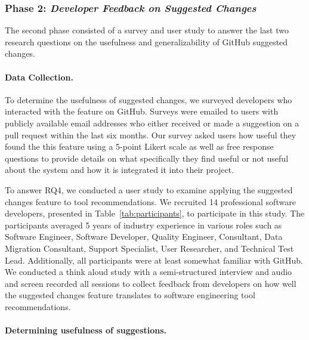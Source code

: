 \subsubsection{Phase 2: \textit{Developer Feedback on Suggested Changes}}

The second phase consisted of a survey and user study to answer the last two research questions on the usefulness and generalizability of GitHub suggested changes.

\paragraph{Data Collection.}

To determine the usefulness of suggested changes, we surveyed developers who interacted with the feature on GitHub. Surveys were emailed to users with publicly available email addresses who either received or made a suggestion on a pull request within the last six months. Our survey asked users how useful they found the this feature using a 5-point Likert scale as well as free response questions to provide details on what specifically they find useful or not useful about the system and how it is integrated it into their project.

To answer RQ4, we conducted a user study to examine applying the suggested changes feature to tool recommendations. We recruited 14 professional software developers, presented in Table~\ref{tab:participants}, to participate in this study. The participants averaged 5 years of industry experience in various roles such as Software Engineer, Software Developer, Quality Engineer, Consultant, Data Migration Consultant, Support Specialist, User Researcher, and Technical Test Lead. Additionally, all participants were at least somewhat familiar with GitHub. We conducted a think aloud study with a semi-structured interview and audio and screen recorded all sessions to collect feedback from developers on how well the suggested changes feature translates to software engineering tool recommendations. 

\paragraph{Determining usefulness of suggestions.}

